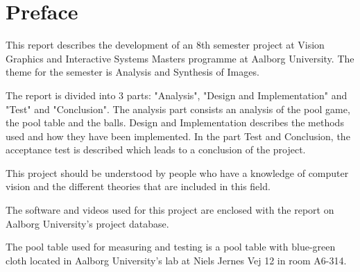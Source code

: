 \chapter*{Preface}
This report describes the development of an 8th semester project at Vision Graphics and Interactive Systems Masters programme at Aalborg University. The theme for the semester is Analysis and Synthesis of Images. 

The report is divided into 3 parts: "Analysis", "Design and Implementation" and "Test" and "Conclusion". The analysis part consists an analysis of the pool game, the pool table and the balls. Design and Implementation describes the methods used and how they have been implemented. In the part Test and Conclusion, the acceptance test is described which leads to a conclusion of the project.

This project should be understood by people who have a knowledge of computer vision and the different theories that are included in this field.

The software and videos used for this project are enclosed with the report on Aalborg University's project database.

The pool table used for measuring and testing is a pool table with blue-green cloth located in Aalborg University's lab at Niels Jernes Vej 12 in room A6-314.